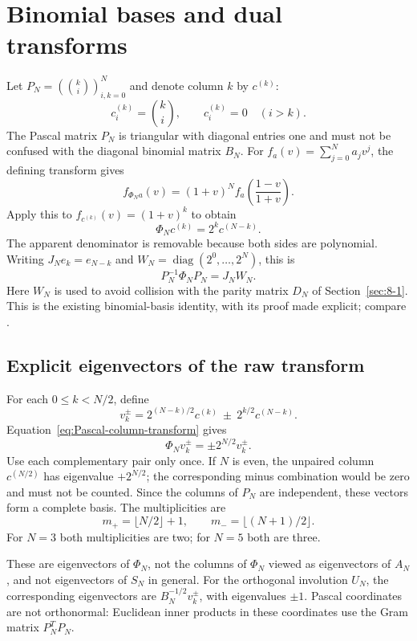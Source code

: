 \section{Binomial bases and dual transforms}
\label{sec:14-5}
Let $P_N=(\binom{k}{i})_{i,k=0}^N$ and denote column $k$ by $c^{(k)}$:
\[
c^{(k)}_i=\binom{k}{i},\qquad c^{(k)}_i=0\quad(i>k).
\]
The Pascal matrix $P_N$ is triangular with diagonal entries one and
must not be confused with the diagonal binomial matrix $B_N$.
For $f_a(v)=\sum_{j=0}^N a_jv^j$, the defining transform gives
\[
f_{\Phi_Na}(v)=(1+v)^N f_a\!\left(\frac{1-v}{1+v}\right).
\]
Apply this to $f_{c^{(k)}}(v)=(1+v)^k$ to obtain
\begin{equation}\label{eq:Pascal-column-transform}
\Phi_Nc^{(k)}=2^k c^{(N-k)}.
\end{equation}
The apparent denominator is removable because both sides are polynomial.
Writing $J_Ne_k=e_{N-k}$ and
$W_N=\operatorname{diag}(2^0,\ldots,2^N)$, this is
\[
P_N^{-1}\Phi_NP_N=J_NW_N.
\]
Here $W_N$ is used to avoid collision with the parity matrix $D_N$
of Section~\ref{sec:8-1}. This is the existing binomial-basis identity,
with its proof made explicit; compare \cite[Section~7.3]{KocikFeynman}.

\subsection{Explicit eigenvectors of the raw transform}
For each $0\leq k<N/2$, define
\[
v_k^{\pm}=2^{(N-k)/2}c^{(k)}\ \pm\ 2^{k/2}c^{(N-k)}.
\]
Equation~\eqref{eq:Pascal-column-transform} gives
\[
\Phi_Nv_k^{\pm}=\pm 2^{N/2}v_k^{\pm}.
\]
Use each complementary pair only once. If $N$ is even, the unpaired
column $c^{(N/2)}$ has eigenvalue $+2^{N/2}$; the corresponding minus
combination would be zero and must not be counted.
Since the columns of $P_N$ are independent, these vectors form a complete
basis. The multiplicities are
\[
m_+=\lfloor N/2\rfloor+1,\qquad
m_-=\lfloor (N+1)/2\rfloor.
\]
For $N=3$ both multiplicities are two; for $N=5$ both are three.

These are eigenvectors of $\Phi_N$, not the columns of $\Phi_N$ viewed
as eigenvectors of $A_N$, and not eigenvectors of $S_N$ in general.
For the orthogonal involution $U_N$, the corresponding eigenvectors are
$B_N^{-1/2}v_k^{\pm}$, with eigenvalues $\pm1$.
Pascal coordinates are not orthonormal: Euclidean inner products in
these coordinates use the Gram matrix $P_N^TP_N$.



